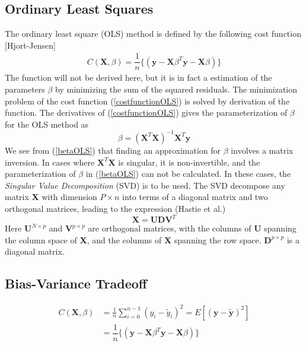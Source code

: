 \documentclass{article}
\begin{document}
\subsection{Ordinary Least Squares}
The ordinary least square (OLS) method is defined by the following cost function [Hjort-Jensen]
\begin{align}\label{costfunctionOLS}
C(\textbf{X},\beta) = \dfrac{1}{n} \{( \textbf{y}-\textbf{X}\beta^{T}\textbf{y}-\textbf{X}\beta)\}
\end{align}
The function will not be derived here, but it is in fact a estimation of the parameters $\beta$ by minimizing the sum of the squared residuals. The minimization problem of the cost function (\ref{costfunctionOLS}) is solved by derivation of the function. The derivatives of (\ref{costfunctionOLS}) gives the parameterization of $\beta$ for the OLS method as
\begin{equation}\label{betaOLS}
\beta = (\textbf{X}^{T}\textbf{X})^{-1}\textbf{X}^{T}\textbf{y}
\end{equation}
We see from (\ref{betaOLS}) that finding an approximation for $\beta$ involves a matrix inversion. In cases where $\textbf{X}^{T}\textbf{X}$ is singular, it is non-invertible, and the parameterization of $\beta$ in (\ref{betaOLS}) can not be calculated. In these cases, the \textit{Singular Value Decomposition} (SVD) is to be used. The SVD decompose any matrix \textbf{X} with dimension $P \times n$ into terms of a diagonal matrix and two orthogonal matrices, leading to the expression (Hastie et al.)
\begin{equation}
\textbf{X} = \textbf{U} \textbf{D} \textbf{V}^{T}
\end{equation}
Here $\textbf{U}^{N \times p}$ and $\textbf{V}^{p \times p}$ are orthogonal matrices, with the columns of \textbf{U} spanning the column space of \textbf{X}, and the columns of \textbf{X} spanning the row space. $\textbf{D}^{p \times p}$ is a diagonal matrix.

\subsection{Bias-Variance Tradeoff}
\begin{align}\label{costfunctionOLS}
C(\textbf{X},\beta) &= \frac{1}{n} \sum_{i=0}^{n-1} (y_{i} - \tilde{y}_{i})^{2} = \textit{E} [(\textbf{y} - \widetilde{\textbf{y}})^{2}]\\
&= \dfrac{1}{n} \{( \textbf{y}-\textbf{X}\beta^{T}\textbf{y}-\textbf{X}\beta)\}
\end{align}
\end{document}
